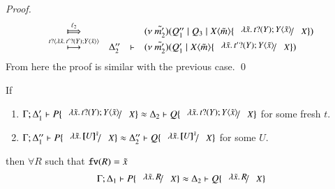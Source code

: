 \begin{proof}
\[\begin{array}{crll}
			\Hby{\ell_2}& & &
			\newsp{\tilde{m_2'}}{Q_1'' \Par Q_3 \Par \appl{X}{\tilde{m}} \subst{\abs{\tilde{x}}{\binp{t}{Y} \appl{Y}{\tilde{x}}}}{X}} \\
			\hby{\bactinp{t}{\abs{\tilde{x}}{\binp{t'}{Y} \appl{Y}{\tilde{x}}}}}
			&\Delta_2''& \proves& \newsp{\tilde{m_2'}}{Q_1' \Par \appl{X}{\tilde{m}} \subst{\abs{\tilde{x}}{\binp{t'}{Y} \appl{Y}{\tilde{x}}}}{X}} \\
		\end{array}
	\]
%
%
	\noi From here the proof is similar with the previous case.
	\qed
\end{proof}



\begin{lemma}\rm
	If 
%
	\begin{enumerate}
		\item	$\horel{\Gamma}{\Delta_1'}{P \subst{\abs{\tilde{x}}{\binp{t}{Y} \appl{Y}{\tilde{x}}}}{X}}{\wb}{\Delta_2}{Q \subst{\abs{\tilde{x}}{\binp{t}{Y} \appl{Y}{\tilde{x}}}}{X}}$
			for some fresh $t$.

		\item	$\horel{\Gamma}{\Delta_1''}{P \subst{\abs{\tilde{x}}{\map{U}^{\tilde{x}}}}{X}}{\wb}{\Delta_2''}{Q \subst{\abs{\tilde{x}}{\map{U}^{\tilde{x}}}}{X}}$
			for some $U$.
	\end{enumerate}
%
	then $\forall R$ such that $\mathtt{fv}(R) = \tilde{x}$
\[
	\horel{\Gamma}{\Delta_1}{P \subst{\abs{\tilde{x}}{R}}{X}}{\wb}{\Delta_2}{Q \subst{\abs{\tilde{x}}{R}}{X}}
\]
\end{lemma}



